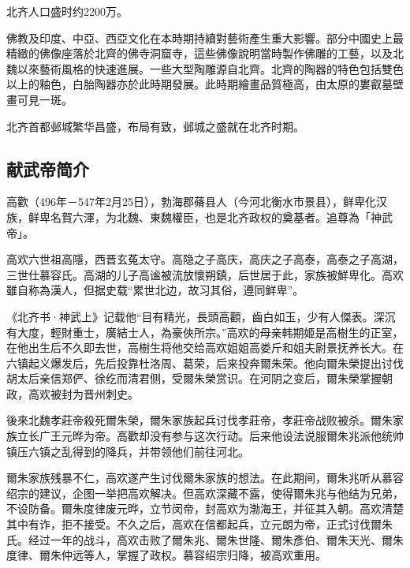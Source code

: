 北齐人口盛时约2200万。

佛教及印度、中亞、西亞文化在本時期持續對藝術產生重大影響。部分中國史上最精緻的佛像座落於北齊的佛寺洞窟寺，這些佛像說明當時製作佛雕的工藝，以及北魏以來藝術風格的快速進展。一些大型陶雕源自北齊。北齊的陶器的特色包括雙色以上的釉色，白胎陶器亦於此時期發展。此時期繪畫品質極高，由太原的婁叡墓壁畫可見一斑。

北齐首都邺城繁华昌盛，布局有致，邺城之盛就在北齐时期。









\subsection{献武帝简介}

高歡（496年－547年2月25日），勃海郡蓨县人（今河北衡水市景县），鲜卑化汉族，鲜卑名賀六渾，为北魏、東魏權臣，也是北齐政权的奠基者。追尊為「神武帝」。

高欢六世祖高隱，西晋玄菟太守。高隐之子高庆，高庆之子高泰，高泰之子高湖，三世仕慕容氏。高湖的儿子高谧被流放懷朔鎮，后世居于此，家族被鮮卑化。高欢雖自称為漢人，但据史载“累世北边，故习其俗，遵同鲜卑”。

《北齐书·神武上》记载他“目有精光，長頭高顴，齒白如玉，少有人傑表。深沉有大度，輕財重士，廣結士人，為豪俠所宗。”高欢的母亲韩期姬是高樹生的正室，在他出生后不久即去世，高樹生将他交给高欢姐姐高娄斤和姐夫尉景抚养长大。在六镇起义爆发后，先后投靠杜洛周、葛荣，后来投奔爾朱荣。他向爾朱榮提出讨伐胡太后亲信郑俨、徐纥而清君侧，受爾朱榮赏识。在河阴之变后，爾朱榮掌握朝政，高欢被封为晋州刺史。

後來北魏孝莊帝殺死爾朱榮，爾朱家族起兵讨伐孝莊帝，孝莊帝战败被杀。爾朱家族立长广王元晔为帝。高歡却没有参与这次行动。后来他设法说服爾朱兆派他统帅镇压六镇之乱得到的降兵，并带领他们前往河北。

爾朱家族残暴不仁，高欢遂产生讨伐爾朱家族的想法。在此期间，爾朱兆听从慕容绍宗的建议，企图一举把高欢解决。但高欢深藏不露，使得爾朱兆与他结为兄弟，不设防备。爾朱度律废元晔，立节闵帝，封高欢为渤海王，并征其入朝。高欢清楚其中有诈，拒不接受。不久之后，高欢在信都起兵，立元朗为帝，正式讨伐爾朱氏。经过一年的战斗，高欢击败了爾朱兆、爾朱世隆、爾朱彥伯、爾朱天光、爾朱度律、爾朱仲远等人，掌握了政权。慕容绍宗归降，被高欢重用。

